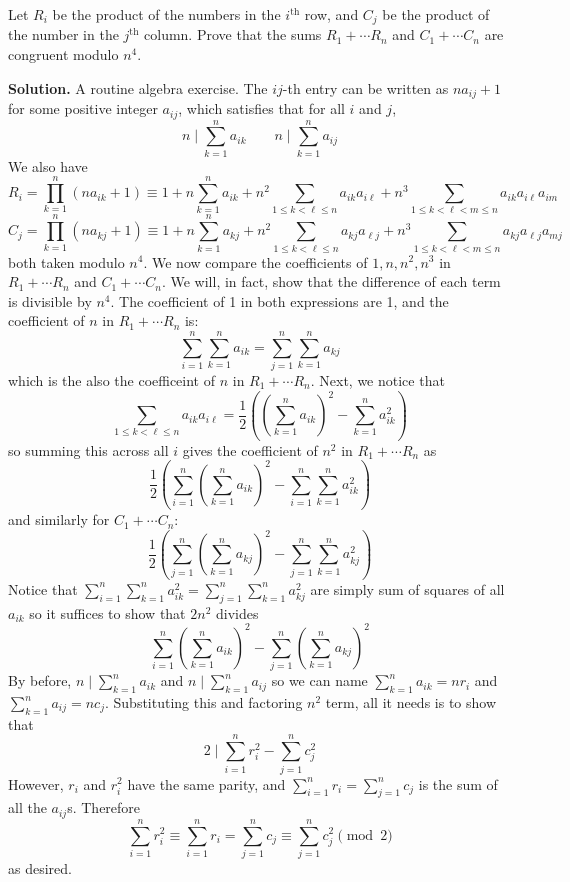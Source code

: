\documentclass[11pt,a4paper]{article}
\begin{document}
\begin{enumerate}
	Let $R_i$ be the product of the numbers in the $i^{\text{th}}$ row, and $C_j$ be the product of the number in the $j^{\text{th}}$ column. Prove that the sums $R_1+\cdots R_n$ and $C_1+\cdots C_n$ are congruent modulo $n^4$.
	
	\textbf{Solution.} A routine algebra exercise. The $ij$-th entry can be written as $na_{ij}+1$ for some positive integer $a_{ij}$, which satisfies that for all $i$ and $j$, 
	\[
	n\mid \displaystyle\sum_{k=1}^n a_{ik}\qquad
	n\mid \displaystyle\sum_{k=1}^n a_{ij}
	\]
	We also have 
	\[
	R_i = \displaystyle\prod_{k=1}^n (na_{ik}+1)
	\equiv 1 + n\displaystyle\sum_{k=1}^n a_{ik} + n^2 \displaystyle\sum_{1\le k<\ell\le n} a_{ik}a_{i\ell}
	+n^3 \displaystyle\sum_{1\le k<\ell<m\le n} a_{ik}a_{i\ell}a_{im}
	\]\[
	C_j = \displaystyle\prod_{k=1}^n (na_{kj}+1)
	\equiv 1 + n\displaystyle\sum_{k=1}^n a_{kj} + n^2 \displaystyle\sum_{1\le k<\ell\le n} a_{kj}a_{\ell j}
	+n^3 \displaystyle\sum_{1\le k<\ell<m\le n} a_{kj}a_{\ell j}a_{mj}
	\]
	both taken modulo $n^4$. 
	We now compare the coefficients of $1, n, n^2, n^3$ in $R_1+\cdots R_n$ and $C_1+\cdots C_n$. 
	We will, in fact, show that the difference of each term is divisible by $n^4$. 
	The coefficient of 1 in both expressions are 1, and the coefficient of $n$ in $R_1+\cdots R_n$ is: 
	\[
	\displaystyle\sum_{i=1}^n \displaystyle\sum_{k=1}^n a_{ik}
	=\displaystyle\sum_{j=1}^n \displaystyle\sum_{k=1}^n a_{kj}
	\]
	which is the also the coefficeint of $n$ in $R_1+\cdots R_n$. 
	Next, we notice that 
	\[
	\displaystyle\sum_{1\le k<\ell\le n} a_{ik}a_{i\ell}
	=\frac 12 \left((\displaystyle\sum_{k=1}^n a_{ik})^2 - \displaystyle\sum_{k=1}^n a_{ik}^2\right)
	\]
	so summing this across all $i$ gives the coefficient of $n^2$ in $R_1+\cdots R_n$ as 
	\[
	\frac 12 \left(\displaystyle\sum_{i=1}^n(\displaystyle\sum_{k=1}^n a_{ik})^2 - \displaystyle\sum_{i=1}^n\displaystyle\sum_{k=1}^n a_{ik}^2\right)
	\]
	and similarly for $C_1+\cdots C_n$: 
	\[
	\frac 12 \left(\displaystyle\sum_{j=1}^n(\displaystyle\sum_{k=1}^n a_{kj})^2 - \displaystyle\sum_{j=1}^n\displaystyle\sum_{k=1}^n a_{kj}^2\right)
	\]
	Notice that $\displaystyle\sum_{i=1}^n\displaystyle\sum_{k=1}^n a_{ik}^2=\displaystyle\sum_{j=1}^n\displaystyle\sum_{k=1}^n a_{kj}^2$ are simply sum of squares of all $a_{ik}$ so it suffices to show that $2n^2$ divides 
	\[
	\displaystyle\sum_{i=1}^n(\displaystyle\sum_{k=1}^n a_{ik})^2
	-\displaystyle\sum_{j=1}^n(\displaystyle\sum_{k=1}^n a_{kj})^2
	\]
	By before, $n\mid \displaystyle\sum_{k=1}^n a_{ik}$ and $n\mid \displaystyle\sum_{k=1}^n a_{ij}$ so we can name $\displaystyle\sum_{k=1}^n a_{ik}=nr_i$ and $\displaystyle\sum_{k=1}^n a_{ij}=nc_j$. Substituting this and factoring $n^2$ term, all it needs is to show that 
	\[
	2\mid \displaystyle\sum_{i=1}^n r_i^2
	-\displaystyle\sum_{j=1}^n c_j^2
	\]
	However, $r_i$ and $r_i^2$ have the same parity, and $\displaystyle\sum_{i=1}^n r_i=\displaystyle\sum_{j=1}^n c_j$ is the sum of all the $a_{ij}$s. Therefore 
	\[
	 \displaystyle\sum_{i=1}^n r_i^2\equiv \displaystyle\sum_{i=1}^n r_i=\displaystyle\sum_{j=1}^n c_j
	 \equiv \displaystyle\sum_{j=1}^n c_j^2\pmod{2}
	\]
	as desired. 
	

\end{enumerate}
\end{document}

